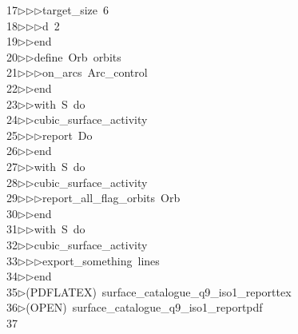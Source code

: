 \begin{tabbing}
17\>$\triangleright$\>$\triangleright$\>$\triangleright$\>target\_size\ 6\ \\[0pt]
18\>$\triangleright$\>$\triangleright$\>$\triangleright$\>d\ 2\ \\[0pt]
19\>$\triangleright$\>$\triangleright$\>end\ \\[0pt]
20\>$\triangleright$\>$\triangleright$\>define\ Orb\ orbits\ \\[0pt]
21\>$\triangleright$\>$\triangleright$\>$\triangleright$\>on\_arcs\ Arc\_control\ \\[0pt]
22\>$\triangleright$\>$\triangleright$\>end\ \\[0pt]
23\>$\triangleright$\>$\triangleright$\>with\ S\ do\ \\[0pt]
24\>$\triangleright$\>$\triangleright$\>cubic\_surface\_activity\ \\[0pt]
25\>$\triangleright$\>$\triangleright$\>$\triangleright$\>report\ Do\ \\[0pt]
26\>$\triangleright$\>$\triangleright$\>end\ \\[0pt]
27\>$\triangleright$\>$\triangleright$\>with\ S\ do\ \\[0pt]
28\>$\triangleright$\>$\triangleright$\>cubic\_surface\_activity\ \\[0pt]
29\>$\triangleright$\>$\triangleright$\>$\triangleright$\>report\_all\_flag\_orbits\ Orb\ \\[0pt]
30\>$\triangleright$\>$\triangleright$\>end\ \\[0pt]
31\>$\triangleright$\>$\triangleright$\>with\ S\ do\ \\[0pt]
32\>$\triangleright$\>$\triangleright$\>cubic\_surface\_activity\ \\[0pt]
33\>$\triangleright$\>$\triangleright$\>$\triangleright$\>export\_something\ lines\ \\[0pt]
34\>$\triangleright$\>$\triangleright$\>end\\[0pt]
35\>$\triangleright$\>(PDFLATEX)\ surface\_catalogue\_q9\_iso1\_reporttex\\[0pt]
36\>$\triangleright$\>(OPEN)\ surface\_catalogue\_q9\_iso1\_reportpdf\\[0pt]
37\>\end{tabbing}
